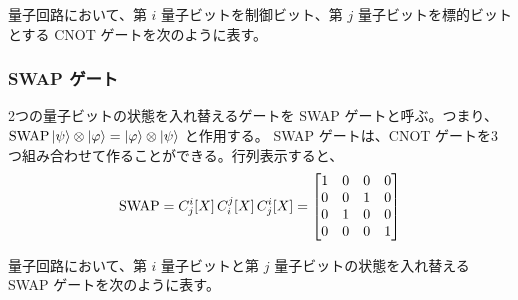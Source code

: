 量子回路において、第 $i$ 量子ビットを制御ビット、第 $j$ 量子ビットを標的ビットとする CNOT ゲートを次のように表す。
\begin{figure}[H]
    \centering
\end{figure}



\subsubsection{SWAP ゲート}
2つの量子ビットの状態を入れ替えるゲートを SWAP ゲートと呼ぶ。つまり、$\mathrm{SWAP} \ket{\psi}\otimes\ket{\varphi} = \ket{\varphi}\otimes\ket{\psi}$ と作用する。
SWAP ゲートは、CNOT ゲートを3つ組み合わせて作ることができる。行列表示すると、
\begin{align}
    \SWAP = C_j^i[X]\,C_i^j[X]\,C_j^i[X]
    = \mqty[
        1 & 0 & 0 & 0 \\
        0 & 0 & 1 & 0 \\
        0 & 1 & 0 & 0 \\
        0 & 0 & 0 & 1
        ]
\end{align}

量子回路において、第 $i$ 量子ビットと第 $j$ 量子ビットの状態を入れ替える SWAP ゲートを次のように表す。
\begin{figure}[H]
    \centering
\end{figure}


